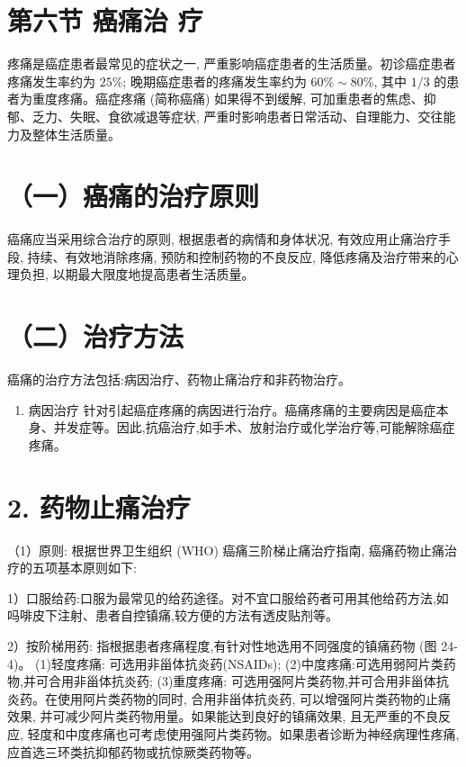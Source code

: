 \documentclass[10pt]{article}
\begin{document}
\section*{第六节 癌痛治 疗}
疼痛是癌症患者最常见的症状之一, 严重影响癌症患者的生活质量。初诊癌症患者疼痛发生率约为 $25 \%$; 晚期癌症患者的疼痛发生率约为 $60 \% \sim 80 \%$, 其中 $1 / 3$ 的患者为重度疼痛。癌症疼痛 (简称癌痛) 如果得不到缓解, 可加重患者的焦虑、抑郁、乏力、失眠、食欲减退等症状, 严重时影响患者日常活动、自理能力、交往能力及整体生活质量。

\section*{（一）癌痛的治疗原则}
癌痛应当采用综合治疗的原则, 根据患者的病情和身体状况, 有效应用止痛治疗手段, 持续、有效地消除疼痛, 预防和控制药物的不良反应, 降低疼痛及治疗带来的心理负担, 以期最大限度地提高患者生活质量。

\section*{（二）治疗方法}
癌痛的治疗方法包括:病因治疗、药物止痛治疗和非药物治疗。

\begin{enumerate}
  \item 病因治疗 针对引起癌症疼痛的病因进行治疗。癌痛疼痛的主要病因是癌症本身、并发症等。因此,抗癌治疗,如手术、放射治疗或化学治疗等,可能解除癌症疼痛。
\end{enumerate}

\section*{2. 药物止痛治疗}
（1）原则: 根据世界卫生组织 (WHO) 癌痛三阶梯止痛治疗指南, 癌痛药物止痛治疗的五项基本原则如下:

1）口服给药:口服为最常见的给药途径。对不宜口服给药者可用其他给药方法,如吗啡皮下注射、患者自控镇痛,较方便的方法有透皮贴剂等。

2）按阶梯用药: 指根据患者疼痛程度,有针对性地选用不同强度的镇痛药物 (图 24-4)。 (1)轻度疼痛: 可选用非甾体抗炎药(NSAIDs); (2)中度疼痛:可选用弱阿片类药物,并可合用非甾体抗炎药; (3)重度疼痛: 可选用强阿片类药物,并可合用非甾体抗炎药。在使用阿片类药物的同时, 合用非甾体抗炎药, 可以增强阿片类药物的止痛效果, 并可减少阿片类药物用量。如果能达到良好的镇痛效果, 且无严重的不良反应, 轻度和中度疼痛也可考虑使用强阿片类药物。如果患者诊断为神经病理性疼痛, 应首选三环类抗抑郁药物或抗惊厥类药物等。
\end{document}
